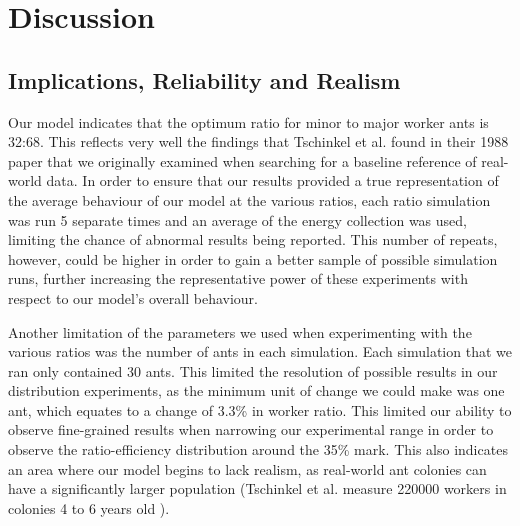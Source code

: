 \section{Discussion}



\subsection{Implications, Reliability and Realism}
Our model indicates that the optimum ratio for minor to major worker ants is 32:68. This reflects very well the findings that Tschinkel et al. found in their 1988 paper \cite{Tschinkel1988} that we originally examined when searching for a baseline reference of real-world data. In order to ensure that our results provided a true representation of the average behaviour of our model at the various ratios, each ratio
simulation was run 5 separate times and an average of the energy collection was used, limiting the chance of abnormal results being reported. This number of repeats, however, could be higher in order to gain a better sample of possible simulation runs, further increasing the representative power of these experiments with respect to our model's overall behaviour.

Another limitation of the parameters we used when experimenting with the various ratios was the number of ants in each simulation. Each simulation that we ran only contained 30 ants. This limited the resolution of possible results in our distribution experiments, as the minimum unit of change we could make was one ant, which equates to a change of 3.3\% in worker
ratio. This limited our ability to observe fine-grained results when narrowing our experimental range in order to observe the ratio-efficiency distribution around the 35\% mark. This also indicates an area where our model begins to lack realism, as real-world ant colonies can have a significantly larger population (Tschinkel et al. measure 220000 workers in colonies 4 to 6 years old \cite{Tschinkel1988}). 

